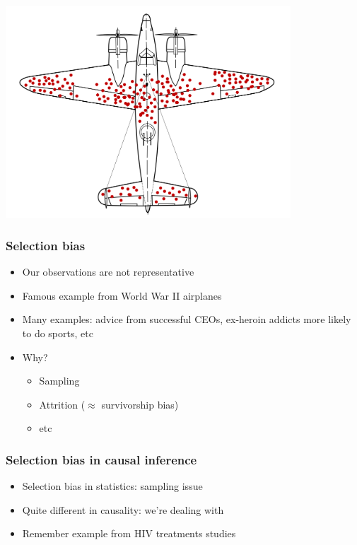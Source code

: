 \documentclass[aspectratio=43]{beamer}
\begin{document}
\begin{frame}
\frametitle{}
\centering

\includegraphics[width = 0.8\textwidth]{../img/Survivorship-bias}

\end{frame}

\begin{frame}
\frametitle{Selection bias}\label{selectbias}
\centering

\begin{itemize}
  \item Our observations are not representative
  \item Famous example from World War II airplanes
  \item Many examples: advice from successful CEOs, ex-heroin addicts more likely to do sports, etc
  \item Why?
  \begin{itemize}
    \item Sampling
    \item Attrition ($\approx$ survivorship bias)
    \item etc
  \end{itemize}
\end{itemize}

\end{frame}


\begin{frame}
\frametitle{Selection bias in causal inference}
\centering

\begin{itemize}
  \item Selection bias in statistics: sampling issue
  \item Quite different in causality: we're dealing with 
  \item Remember example from HIV treatments studies
\end{itemize}

\end{frame}
\end{document}

